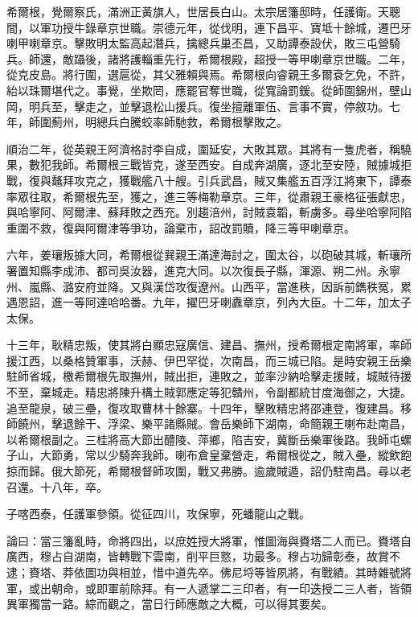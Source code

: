 \begin{pinyinscope}
希爾根，覺爾察氏，滿洲正黃旗人，世居長白山。太宗居籓邸時，任護衛。天聰間，以軍功授牛錄章京世職。崇德元年，從伐明，連下昌平、寶坻十餘城，遷巴牙喇甲喇章京。擊敗明太監高起潛兵，擒總兵巢丕昌，又助譚泰設伏，敗三屯營騎兵。師還，敵躡後，諸將護輜重先行，希爾根殿，超授一等甲喇章京世職。二年，從克皮島。將行圍，選扈從，其父雅賴與焉。希爾根向睿親王多爾袞乞免，不許，紿以珠爾堪代之。事覺，坐欺罔，應罷官奪世職，從寬論罰鍰。從師圍錦州，壁山岡，明兵至，擊走之，並擊退松山援兵。復坐擅離軍伍、言事不實，停敘功。七年，師圍薊州，明總兵白騰蛟率師馳救，希爾根擊敗之。

順治二年，從英親王阿濟格討李自成，圍延安，大敗其眾。其將有一隻虎者，稱驍果，數犯我師。希爾根三戰皆克，遂至西安。自成奔湖廣，逐北至安陸，賊據城拒戰，復與鼇拜攻克之，獲戰艦八十艘。引兵武昌，賊又集艦五百浮江將東下，譚泰率眾往取，希爾根先至，獲之，進三等梅勒章京。三年，從肅親王豪格征張獻忠，與哈寧阿、阿爾津、蘇拜敗之西充。別趨涪州，討賊袁韜，斬虜多。尋坐哈寧阿陷重圍不救，復與阿爾津等爭功，論棄市，詔改罰贖，降三等甲喇章京。

六年，姜瓖叛據大同，希爾根從巽親王滿達海討之，圍太谷，以砲破其城，斬瓖所署置知縣李成沛、都司吳汝器，進克大同。以次復長子縣，渾源、朔二州。永寧州、嵐縣、潞安府並降。又與漢岱攻復遼州。山西平，當進秩，因訴前鐫秩冤，累遇恩詔，進一等阿達哈哈番。九年，擢巴牙喇纛章京，列內大臣。十二年，加太子太保。

十三年，耿精忠叛，使其將白顯忠寇廣信、建昌、撫州，授希爾根定南將軍，率師援江西，以桑格贊軍事，沃赫、伊巴罕從，次南昌，而三城已陷。是時安親王岳樂駐師省城，檄希爾根先取撫州，賊出拒，連敗之，並率沙納哈擊走援賊，城賊待援不至，棄城走。精忠將陳升構土賊郭應定等犯贛州，令副都統甘度海御之，大捷。追至龍泉，破三壘，復攻取曹林十餘寨。十四年，擊敗精忠將邵連登，復建昌。移師饒州，擊退餘干、浮梁、樂平諸縣賊。會岳樂師下湖南，命簡親王喇布赴南昌，以希爾根副之。三桂將高大節出醴陵、萍鄉，陷吉安，冀斷岳樂軍後路。我師屯螺子山，大節勇，常以少騎奔我師。喇布倉皇棄營走，希爾根從之，賊入壘，縱飲飽掠而歸。俄大節死，希爾根督師攻圍，戰又弗勝。逾歲賊遁，詔仍駐南昌。尋以老召還。十八年，卒。

子喀西泰，任護軍參領。從征四川，攻保寧，死蟠龍山之戰。

論曰：當三籓亂時，命將四出，以庶姓授大將軍，惟圖海與賚塔二人而已。賚塔自廣西，穆占自湖南，皆轉戰下雲南，削平巨憝，功最多。穆占功歸彰泰，故賞不逮；賚塔、莽依圖功與相並，惜中道先卒。佛尼埒等皆夙將，有戰績。其時雜號將軍，或出朝命，或即軍前除拜。有一人遞掌二三印者，有一印迭授二三人者，皆領異軍獨當一路。綜而觀之，當日行師應敵之大概，可以得其要矣。


\end{pinyinscope}